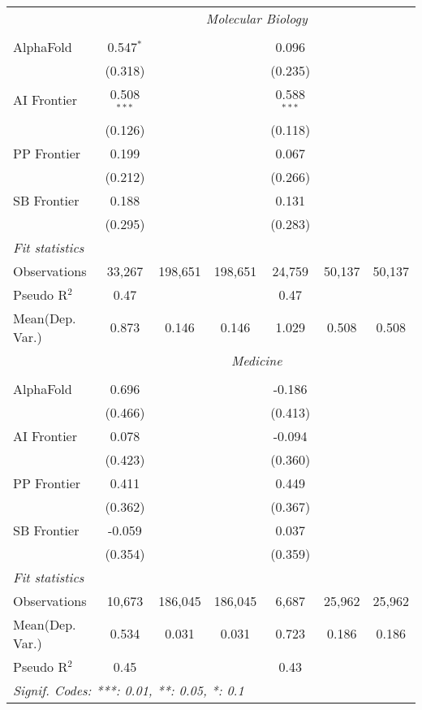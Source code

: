 \begin{tabular}{lcccccc}
 & \multicolumn{6}{c}{\textit{Molecular Biology}} \\ \\
   AlphaFold    & 0.547$^{*}$   &         &         & 0.096         &        &   \\   
                & (0.318)       &         &         & (0.235)       &        &   \\   
   AI Frontier  & 0.508$^{***}$ &         &         & 0.588$^{***}$ &        &   \\   
                & (0.126)       &         &         & (0.118)       &        &   \\   
   PP Frontier  & 0.199         &         &         & 0.067         &        &   \\   
                & (0.212)       &         &         & (0.266)       &        &   \\   
   SB Frontier  & 0.188         &         &         & 0.131         &        &   \\   
                & (0.295)       &         &         & (0.283)       &        &   \\   
   \midrule
   \emph{Fit statistics}\\
   Observations & 33,267        & 198,651 & 198,651 & 24,759        & 50,137 & 50,137\\  
   Pseudo R$^2$ & 0.47          &         &         & 0.47          &        & \\  
   
Mean(Dep. Var.) & 0.873 & 0.146 & 0.146 & 1.029 & 0.508 & 0.508 \\
 & \multicolumn{6}{c}{\textit{Medicine}} \\ \\
   AlphaFold    & 0.696    &         &         & -0.186  &        &   \\   
                & (0.466)  &         &         & (0.413) &        &   \\   
   AI Frontier  & 0.078    &         &         & -0.094  &        &   \\   
                & (0.423)  &         &         & (0.360) &        &   \\   
   PP Frontier  & 0.411    &         &         & 0.449   &        &   \\   
                & (0.362)  &         &         & (0.367) &        &   \\   
   SB Frontier  & -0.059   &         &         & 0.037   &        &   \\   
                & (0.354)  &         &         & (0.359) &        &   \\   
   \midrule
   \emph{Fit statistics}\\
   Observations & 10,673   & 186,045 & 186,045 & 6,687   & 25,962 & 25,962\\  
Mean(Dep. Var.) & 0.534 & 0.031 & 0.031 & 0.723 & 0.186 & 0.186 \\
   Pseudo R$^2$ & 0.45     &         &         & 0.43    &        & \\  
   \midrule \midrule
   \multicolumn{7}{l}{\emph{Signif. Codes: ***: 0.01, **: 0.05, *: 0.1}}\\
\end{tabular}
\par\endgroup
